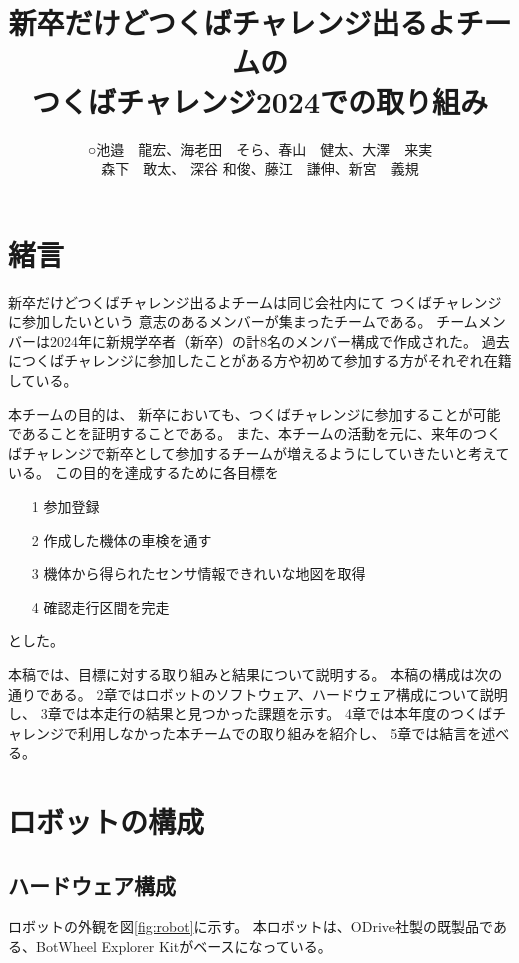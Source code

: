 \documentclass[twocolumn,9pt]{jsproceedings}
\title{新卒だけどつくばチャレンジ出るよチームの\\つくばチャレンジ2024での取り組み}
\author{○池邉　龍宏\authorrefmark{1}、海老田　そら\authorrefmark{1}、春山　健太\authorrefmark{1}、大澤　来実\authorrefmark{1}\\森下　敢太\authorrefmark{1}、
深谷 和俊\authorrefmark{1}、藤江　謙伸\authorrefmark{1}、新宮　義規\authorrefmark{1}}
\affiliation{新卒だけどつくばチャレンジ出るよ}
\begin{document}
\maketitle


\section{緒言}

新卒だけどつくばチャレンジ出るよチームは同じ会社内にて
つくばチャレンジに参加したいという
意志のあるメンバーが集まったチームである。
チームメンバーは2024年に新規学卒者（新卒）の計8名のメンバー構成で作成された。
過去につくばチャレンジに参加したことがある方や初めて参加する方がそれぞれ在籍している。

本チームの目的は、
新卒においても、つくばチャレンジに参加することが可能であることを証明することである。
また、本チームの活動を元に、来年のつくばチャレンジで新卒として参加するチームが増えるようにしていきたいと考えている。
この目的を達成するために各目標を
\begin{itemize}
  \item[1] 参加登録
  \item[2] 作成した機体の車検を通す
  \item[3] 機体から得られたセンサ情報できれいな地図を取得
  \item[4] 確認走行区間を完走
\end{itemize}
とした。


本稿では、目標に対する取り組みと結果について説明する。
本稿の構成は次の通りである。
2章ではロボットのソフトウェア、ハードウェア構成について説明し、
3章では本走行の結果と見つかった課題を示す。
4章では本年度のつくばチャレンジで利用しなかった本チームでの取り組みを紹介し、
5章では結言を述べる。

\section{ロボットの構成}

\subsection{ハードウェア構成}
ロボットの外観を図\ref{fig:robot}に示す。
本ロボットは、ODrive社製の既製品である、BotWheel Explorer Kit\cite{RTshop}がベースになっている。
\end{document}
